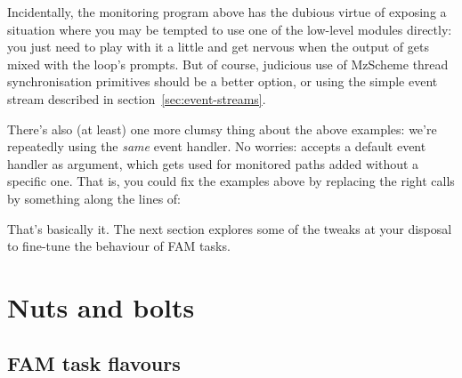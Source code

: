 Incidentally, the monitoring program above has the dubious virtue of
exposing a situation where you may be tempted to use one of the
low-level modules directly: you just need to play with it a little and
get nervous when the output of  gets mixed with the
loop's prompts. But of course, judicious use of MzScheme thread
synchronisation primitives should be a better option, or using the
simple event stream described in section~\ref{sec:event-streams}.

There's also (at least) one more clumsy thing about the above
examples: we're repeatedly using the \textit{same} event handler. No
worries:  accepts a default event handler as
argument, which gets used for monitored paths added without a specific
one. That is, you could fix the examples above by replacing the right
calls by something along the lines of:

That's basically it. The next section explores some of the tweaks at
your disposal to fine-tune the behaviour of FAM tasks.

\section{Nuts and bolts}
\label{sec:nuts-bolts}

\subsection{FAM task flavours}
\label{sec:fam-task-flavours}

